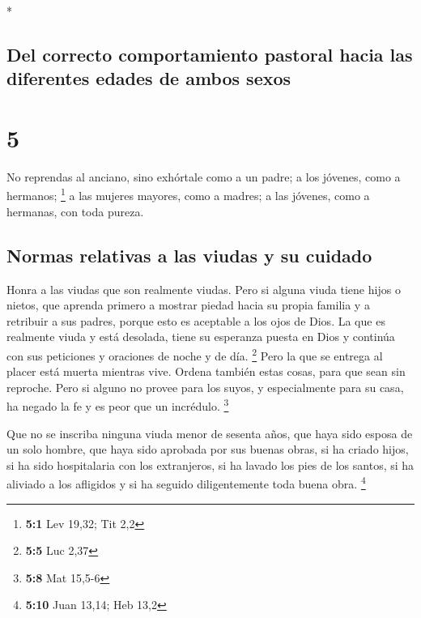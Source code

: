 \begin{paracol}{2}
\switchcolumn[0]*

\hypertarget{del-correcto-comportamiento-pastoral-hacia-las-diferentes-edades-de-ambos-sexos}{%
\subsection{Del correcto comportamiento pastoral hacia las diferentes
edades de ambos
sexos}\label{del-correcto-comportamiento-pastoral-hacia-las-diferentes-edades-de-ambos-sexos}}

\hypertarget{section-8}{%
\section{5}\label{section-8}}

 No reprendas al anciano, sino exhórtale como a un padre;
a los jóvenes, como a hermanos; \footnote{\textbf{5:1} Lev 19,32; Tit
  2,2}  a las mujeres mayores, como a madres; a las
jóvenes, como a hermanas, con toda pureza.

\hypertarget{normas-relativas-a-las-viudas-y-su-cuidado}{%
\subsection{Normas relativas a las viudas y su
cuidado}\label{normas-relativas-a-las-viudas-y-su-cuidado}}

 Honra a las viudas que son realmente viudas.
 Pero si alguna viuda tiene hijos o nietos, que aprenda
primero a mostrar piedad hacia su propia familia y a retribuir a sus
padres, porque esto es aceptable a los ojos de Dios.  La
que es realmente viuda y está desolada, tiene su esperanza puesta en
Dios y continúa con sus peticiones y oraciones de noche y de día.
\footnote{\textbf{5:5} Luc 2,37}  Pero la que se entrega
al placer está muerta mientras vive.  Ordena también estas
cosas, para que sean sin reproche.  Pero si alguno no
provee para los suyos, y especialmente para su casa, ha negado la fe y
es peor que un incrédulo. \footnote{\textbf{5:8} Mat 15,5-6}

 Que no se inscriba ninguna viuda menor de sesenta años,
que haya sido esposa de un solo hombre,  que haya sido
aprobada por sus buenas obras, si ha criado hijos, si ha sido
hospitalaria con los extranjeros, si ha lavado los pies de los santos,
si ha aliviado a los afligidos y si ha seguido diligentemente toda buena
obra. \footnote{\textbf{5:10} Juan 13,14; Heb 13,2}


\end{paracol}
